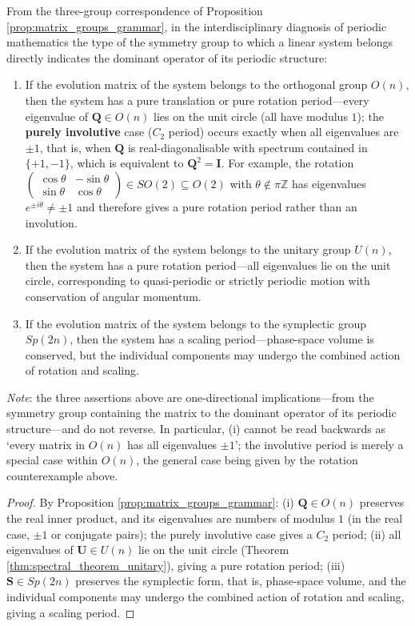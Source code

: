 \begin{corollary}\label{cor:matrix_group_diagnosis}
From the three-group correspondence of Proposition \ref{prop:matrix_groups_grammar}, in the interdisciplinary diagnosis of periodic mathematics the type of the symmetry group to which a linear system belongs directly indicates the dominant operator of its periodic structure:
\begin{enumerate}[label=(\roman*)]
    \item If the evolution matrix of the system belongs to the orthogonal group $O(n)$, then the system has a pure translation or pure rotation period---every eigenvalue of $\mathbf{Q}\in O(n)$ lies on the unit circle (all have modulus $1$); the \textbf{purely involutive} case ($C_2$ period) occurs exactly when all eigenvalues are $\pm 1$, that is, when $\mathbf{Q}$ is real-diagonalisable with spectrum contained in $\{+1,-1\}$, which is equivalent to $\mathbf{Q}^2=\mathbf{I}$. For example, the rotation $\begin{pmatrix}\cos\theta&-\sin\theta\\ \sin\theta&\cos\theta\end{pmatrix}\in SO(2)\subseteq O(2)$ with $\theta\notin\pi\mathbb{Z}$ has eigenvalues $e^{\pm i\theta}\neq\pm1$ and therefore gives a pure rotation period rather than an involution.
    \item If the evolution matrix of the system belongs to the unitary group $U(n)$, then the system has a pure rotation period---all eigenvalues lie on the unit circle, corresponding to quasi-periodic or strictly periodic motion with conservation of angular momentum.
    \item If the evolution matrix of the system belongs to the symplectic group $Sp(2n)$, then the system has a scaling period---phase-space volume is conserved, but the individual components may undergo the combined action of rotation and scaling.
\end{enumerate}
\emph{Note}: the three assertions above are one-directional implications---from the symmetry group containing the matrix to the dominant operator of its periodic structure---and do not reverse. In particular, (i) cannot be read backwards as `every matrix in $O(n)$ has all eigenvalues $\pm 1$'; the involutive period is merely a special case within $O(n)$, the general case being given by the rotation counterexample above.
\end{corollary}

\begin{proof}
By Proposition \ref{prop:matrix_groups_grammar}: (i) $\mathbf{Q} \in O(n)$ preserves the real inner product, and its eigenvalues are numbers of modulus $1$ (in the real case, $\pm 1$ or conjugate pairs); the purely involutive case gives a $C_2$ period; (ii) all eigenvalues of $\mathbf{U} \in U(n)$ lie on the unit circle (Theorem \ref{thm:spectral_theorem_unitary}), giving a pure rotation period; (iii) $\mathbf{S} \in Sp(2n)$ preserves the symplectic form, that is, phase-space volume, and the individual components may undergo the combined action of rotation and scaling, giving a scaling period.
\end{proof}


